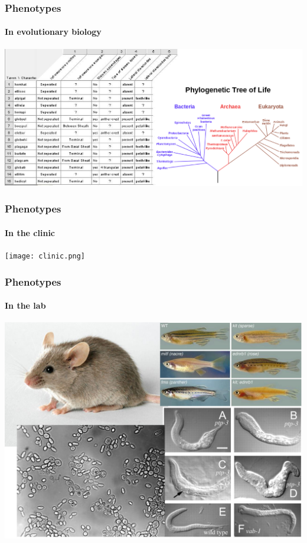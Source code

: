 \documentclass{beamer}
\begin{document}
\begin{frame}
\frametitle{Phenotypes}
\framesubtitle{In evolutionary biology}
\centerline{\includegraphics[width=.8\textwidth]{phylogen.png}}
\end{frame}

\begin{frame}
\frametitle{Phenotypes}
\framesubtitle{In the clinic}
\centerline{\texttt{[image: clinic.png]}}

\end{frame}

\begin{frame}
\frametitle{Phenotypes}
\framesubtitle{In the lab}
\centerline{\includegraphics[width=.8\textwidth]{lab.png}}
\end{frame}
\end{document}
